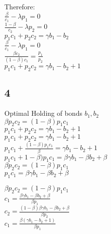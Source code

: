 \documentclass[11pt]{article}
\begin{document}
Therefore:\\

$\frac{\beta}{c_{1}}-\lambda p_{1}=0$\\

$\frac{1-\beta}{c_{2}}-\lambda p_{2}=0$\\

$p_{1}c_{1}+p_{2}c_{2}=\gamma b_{1}-b_{2}$\\

$\frac{\beta}{c_{1}}-\lambda p_{1}=0$\\


$\frac{\beta c_{2}}{(1-\beta) c_{1}}=\frac{p_{1}}{p_{2}}$\\

$p_{1}c_{1}+p_{2}c_{2}=\gamma b_{1}-b_{2}+1$\\


\subsection{4}

Optimal Holding of bonds $b_{1},b_{2}$\\


$\beta p_{2} c_{2}=(1-\beta)p_{1}c_{1}$\\


$p_{1}c_{1}+p_{2}c_{2}=\gamma b_{1}-b_{2}+1$\\


$p_{1}c_{1}+p_{2}c_{2}=\gamma b_{1}-b_{2}+1$\\


$p_{1}c_{1}+\frac{(1-\beta)p_{1}c_{1}}{\beta}=\gamma b_{1}-b_{2}+1$\\


$p_{1}c_{1}+1-\beta)p_{1}c_{1}=\beta\gamma b_{1}-\beta b_{2}+\beta$\\


$\beta p_{2} c_{2}=(1-\beta)p_{1}c_{1}$\\


$p_{1}c_{1}=\beta\gamma b_{1}-\beta b_{2}+\beta$


$\beta p_{2} c_{2}=(1-\beta)p_{1}c_{1}$\\

$c_{1}=\frac{\beta\gamma b_{1}-\beta b_{2}+\beta}{\beta p_{1}}$\\

$c_{2}=\frac{(1-\beta)\beta\gamma b_{1}-\beta b_{2}+\beta}{\beta p_{2}}$\\



$c_{1}=\frac{\beta(\gamma b_{1}- b_{2}+1)}{\beta p_{1}}$\\
\end{document}
